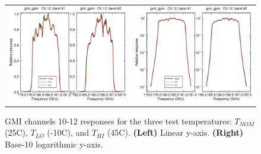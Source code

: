 \begin{figure}[H]
\begin{tabular}{c c}
    \includegraphics[scale=0.35]{graphics/lin/gmi_gpm-12.eps} &
    \includegraphics[scale=0.35]{graphics/log/gmi_gpm-12.eps}
  \end{tabular}
  \caption{GMI channels 10-12 responses for the three test temperatures: $T_{NOM}$ (25\textdegree{}C), $T_{LO}$ (-10\textdegree{}C), and $T_{HI}$ (45\textdegree{}C). \textbf{(Left)} Linear y-axis. \textbf{(Right)} Base-10 logarithmic y-axis.}
  \label{fig:ch10-12_response}
\end{figure}


